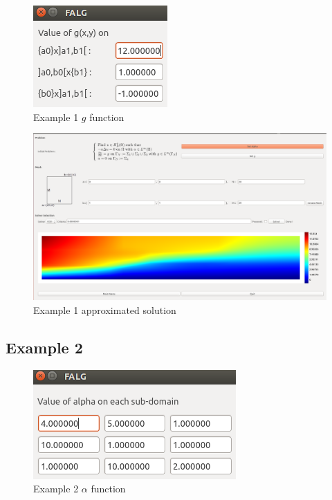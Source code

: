 \documentclass[a4paper]{report}
\begin{document}
\begin{figure}[H]
\begin{center}
\includegraphics[scale=0.50]{example_1_g.png}\caption{Example 1 $g$ function}
\end{center}
\end{figure}


\begin{figure}[H]
\begin{center}
\includegraphics[scale=0.23]{example_1_solution.png}\caption{Example 1 approximated solution}
\end{center}
\end{figure}
 \newpage
\subsection{Example 2}
\begin{figure}[H]
\begin{center}
\includegraphics[scale=0.50]{example_2_alpha.png}\caption{Example 2 $\alpha$ function}
\end{center}
\end{figure}
\end{document}

